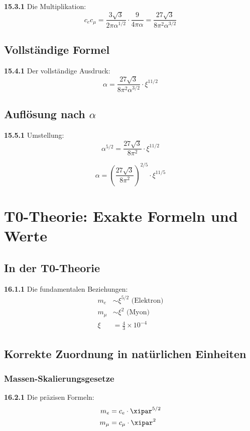 \noindent \textbf{15.3.1} Die Multiplikation:
\[
c_e c_\mu = \frac{3\sqrt{3}}{2\pi\alpha^{1/2}} \cdot \frac{9}{4\pi\alpha} = \frac{27\sqrt{3}}{8\pi^2\alpha^{3/2}}
\]

\subsection{Vollständige Formel}

\noindent \textbf{15.4.1} Der vollständige Ausdruck:
\[
\alpha = \frac{27\sqrt{3}}{8\pi^2\alpha^{3/2}} \cdot \xi^{11/2}
\]

\subsection{Auflösung nach $\alpha$}

\noindent \textbf{15.5.1} Umstellung:
\[
\alpha^{5/2} = \frac{27\sqrt{3}}{8\pi^2} \cdot \xi^{11/2}
\]

\[
\alpha = \left(\frac{27\sqrt{3}}{8\pi^2}\right)^{2/5} \cdot \xi^{11/5}
\]


\section{T0-Theorie: Exakte Formeln und Werte}

\subsection{In der T0-Theorie}

\noindent \textbf{16.1.1} Die fundamentalen Beziehungen:
\begin{align}
	m_e &\sim \xi^{5/2} \text{ (Elektron)} \\
	m_\mu &\sim \xi^2 \text{ (Myon)} \\
	\xi &= \frac{4}{3} \times 10^{-4} 
\end{align}

\subsection{Korrekte Zuordnung in natürlichen Einheiten}

\subsubsection{Massen-Skalierungsgesetze}
\noindent \textbf{16.2.1} Die präzisen Formeln:
\begin{align}
	m_e &= c_e \cdot \xipar^{5/2} \\
	m_\mu &= c_\mu \cdot \xipar^2
\end{align}

